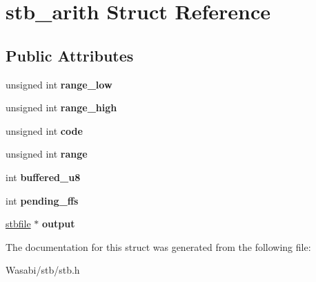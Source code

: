 \hypertarget{structstb__arith}{}\section{stb\+\_\+arith Struct Reference}
\label{structstb__arith}
\subsection*{Public Attributes}
\begin{DoxyCompactItemize}
\item 
unsigned int {\bfseries range\+\_\+low}\hypertarget{structstb__arith_a05dcf4c05b5235b69395fb7daaf3b85c}{}\label{structstb__arith_a05dcf4c05b5235b69395fb7daaf3b85c}

\item 
unsigned int {\bfseries range\+\_\+high}\hypertarget{structstb__arith_ae58b37476f74b31dbb0c60d2d6d06b40}{}\label{structstb__arith_ae58b37476f74b31dbb0c60d2d6d06b40}

\item 
unsigned int {\bfseries code}\hypertarget{structstb__arith_a65eb39d7caf85537dfceaa777367c2d3}{}\label{structstb__arith_a65eb39d7caf85537dfceaa777367c2d3}

\item 
unsigned int {\bfseries range}\hypertarget{structstb__arith_a10422ba40f3faab47f3edc470dc43163}{}\label{structstb__arith_a10422ba40f3faab47f3edc470dc43163}

\item 
int {\bfseries buffered\+\_\+u8}\hypertarget{structstb__arith_a2093b2b33bdf4b751f63d339fdf4a6db}{}\label{structstb__arith_a2093b2b33bdf4b751f63d339fdf4a6db}

\item 
int {\bfseries pending\+\_\+ffs}\hypertarget{structstb__arith_a974ec2b6824ce405ed93e5ee65c48e68}{}\label{structstb__arith_a974ec2b6824ce405ed93e5ee65c48e68}

\item 
\hyperlink{structstbfile}{stbfile} $\ast$ {\bfseries output}\hypertarget{structstb__arith_a6181c0a64c853bea73c6dec20399a573}{}\label{structstb__arith_a6181c0a64c853bea73c6dec20399a573}

\end{DoxyCompactItemize}


The documentation for this struct was generated from the following file\+:\begin{DoxyCompactItemize}
\item 
Wasabi/stb/stb.\+h\end{DoxyCompactItemize}
